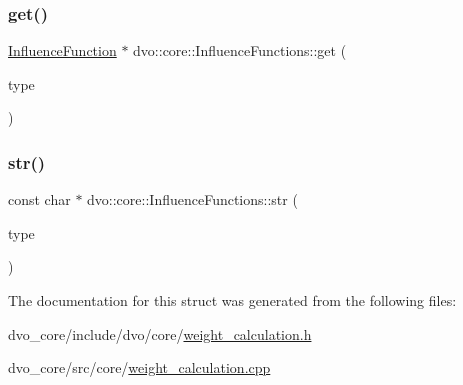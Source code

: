\subsubsection{\texorpdfstring{get()}{get()}}
{\footnotesize\ttfamily \mbox{\hyperlink{classdvo_1_1core_1_1_influence_function}{Influence\+Function}} $\ast$ dvo\+::core\+::\+Influence\+Functions\+::get (\begin{DoxyParamCaption}\item[{\mbox{\hyperlink{structdvo_1_1core_1_1_influence_functions_a3fcb0831eb60e196888641a64fff665f}{Influence\+Functions\+::enum\+\_\+t}}}]{type }\end{DoxyParamCaption})\hspace{0.3cm}{\ttfamily [static]}}

\mbox{\label{structdvo_1_1core_1_1_influence_functions_a8440157ce492ecc76e375d637a194db9}} 
\subsubsection{\texorpdfstring{str()}{str()}}
{\footnotesize\ttfamily const char $\ast$ dvo\+::core\+::\+Influence\+Functions\+::str (\begin{DoxyParamCaption}\item[{\mbox{\hyperlink{structdvo_1_1core_1_1_influence_functions_a3fcb0831eb60e196888641a64fff665f}{enum\+\_\+t}}}]{type }\end{DoxyParamCaption})\hspace{0.3cm}{\ttfamily [static]}}



The documentation for this struct was generated from the following files\+:\begin{DoxyCompactItemize}
\item 
dvo\+\_\+core/include/dvo/core/\mbox{\hyperlink{weight__calculation_8h}{weight\+\_\+calculation.\+h}}\item 
dvo\+\_\+core/src/core/\mbox{\hyperlink{weight__calculation_8cpp}{weight\+\_\+calculation.\+cpp}}\end{DoxyCompactItemize}
